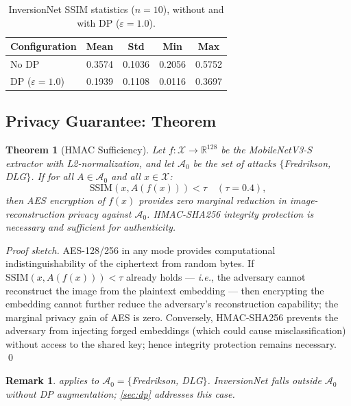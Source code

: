 \documentclass[journal]{IEEEtran}
\newtheorem{theorem}{Theorem}
\newtheorem{remark}{Remark}
\newcommand{\ssim}{\mathrm{SSIM}}
\newcommand{\eps}{\varepsilon}
\newcommand{\MN}{MobileNetV3-S\xspace}
\newcommand{\ie}{\textit{i.e.},\xspace}
\begin{document}
\begin{table}[tb]
  \centering
  \caption{InversionNet SSIM statistics ($n=10$), without and with DP ($\eps=1.0$).}
  \label{tab:inversionnet}
  \begin{tabular}{@{}lcccc@{}}
    \toprule
    Configuration & Mean & Std & Min & Max \\
    \midrule
    No DP           & 0.3574 & 0.1036 & 0.2056 & 0.5752 \\
    DP ($\eps=1.0$) & 0.1939 & 0.1108 & 0.0116 & 0.3697 \\
    \bottomrule
  \end{tabular}
\end{table}

\subsection{Privacy Guarantee: Theorem}

\begin{theorem}[HMAC Sufficiency]
\label{thm:hmac}
Let $f : \mathcal{X} \to \mathbb{R}^{128}$ be the \MN extractor with
L2-normalization, and let $\mathcal{A}_0$ be the set of attacks
$\{$Fredrikson, DLG$\}$.
If for all $A \in \mathcal{A}_0$ and all $x \in \mathcal{X}$:
\[
  \ssim(x, A(f(x))) < \tau \quad (\tau = 0.4),
\]
then AES encryption of $f(x)$ provides zero marginal reduction in
image-reconstruction privacy against $\mathcal{A}_0$.
HMAC-SHA256 integrity protection is necessary and sufficient
for authenticity.
\end{theorem}

\begin{proof}[Proof sketch]
AES-128/256 in any mode provides computational indistinguishability
of the ciphertext from random bytes.
If $\ssim(x, A(f(x))) < \tau$ already holds --- \ie the adversary
cannot reconstruct the image from the plaintext embedding --- then
encrypting the embedding cannot further reduce the adversary's
reconstruction capability; the marginal privacy gain of AES is zero.
Conversely, HMAC-SHA256 prevents the adversary from injecting
forged embeddings (which could cause misclassification) without
access to the shared key; hence integrity protection remains necessary.
\qed
\end{proof}

\begin{remark}
 applies to $\mathcal{A}_0 = \{$Fredrikson, DLG$\}$.
InversionNet falls outside $\mathcal{A}_0$ without DP augmentation;
\cref{sec:dp} addresses this case.
\end{remark}
\end{document}
